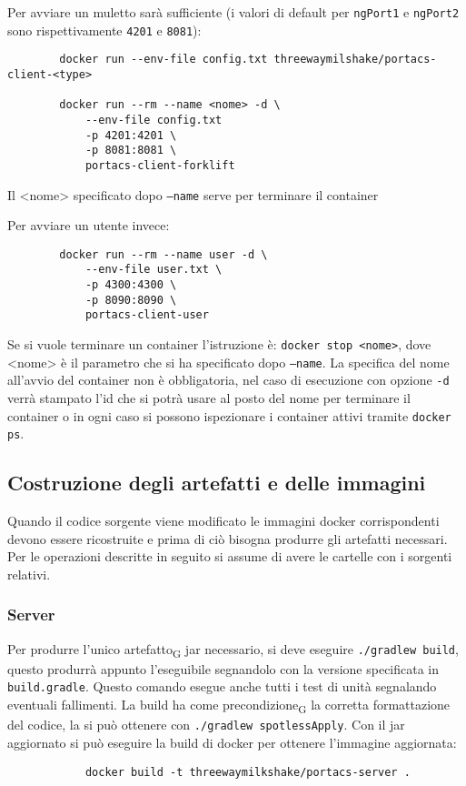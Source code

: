     Per avviare un muletto sarà sufficiente (i valori di default per \texttt{ngPort1} e \texttt{ngPort2} sono rispettivamente \texttt{4201} e \texttt{8081}):
    \begin{verbatim}
        docker run --env-file config.txt threewaymilshake/portacs-client-<type>

        docker run --rm --name <nome> -d \
            --env-file config.txt
            -p 4201:4201 \
            -p 8081:8081 \
            portacs-client-forklift
    \end{verbatim}
    Il <nome> specificato dopo \texttt{--name} serve per terminare il container

    Per avviare un utente invece:
    \begin{verbatim}
        docker run --rm --name user -d \
            --env-file user.txt \
            -p 4300:4300 \
            -p 8090:8090 \
            portacs-client-user
    \end{verbatim}

        Se si vuole terminare un container l'istruzione è: \texttt{docker stop <nome>}, dove <nome> è il parametro che si ha specificato dopo \texttt{---name}. La specifica del nome all'avvio del container non è obbligatoria, nel caso di esecuzione con opzione \texttt{-d} verrà stampato l'id che si potrà usare al posto del nome per terminare il container o in ogni caso si possono ispezionare i container attivi tramite \texttt{docker ps}.

\clearpage
\subsection{Costruzione degli artefatti e delle immagini}
    Quando il codice sorgente viene modificato le immagini docker corrispondenti devono essere ricostruite e prima di ciò bisogna produrre gli artefatti necessari. Per le operazioni descritte in seguito si assume di avere le cartelle con i sorgenti relativi.
    \subsubsection{Server}
        Per produrre l'unico artefatto\textsubscript{G} jar necessario, si deve eseguire \texttt{./gradlew build}, questo produrrà appunto l'eseguibile segnandolo con la versione specificata in \texttt{build.gradle}. Questo comando esegue anche tutti i test di unità segnalando eventuali fallimenti. La build ha come precondizione\textsubscript{G} la corretta formattazione del codice, la si può ottenere con \texttt{./gradlew spotlessApply}.
        Con il jar aggiornato si può eseguire la build di docker per ottenere l'immagine aggiornata:
        \begin{verbatim}
            docker build -t threewaymilkshake/portacs-server .
        \end{verbatim}

